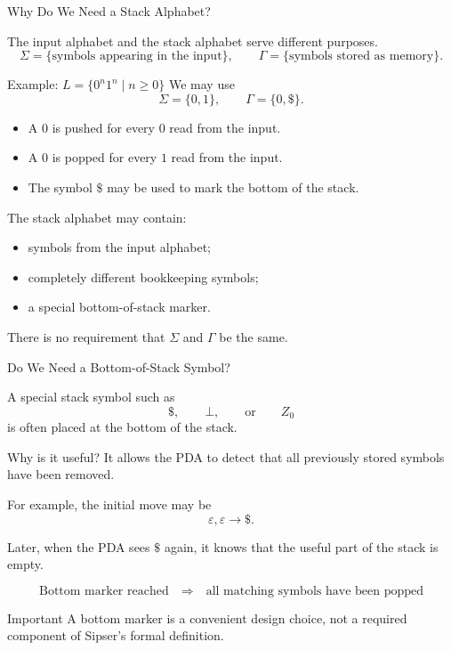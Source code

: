 \documentclass[aspectratio=169,10pt]{beamer}
\begin{document}
\begin{frame}{Why Do We Need a Stack Alphabet?}

\small
The input alphabet and the stack alphabet serve different purposes.
\[
\Sigma=\{\text{symbols appearing in the input}\},
\qquad
\Gamma=\{\text{symbols stored as memory}\}.
\]

\begin{exampleblock}{Example: \(L=\{0^n1^n\mid n\geq 0\}\)}
We may use
\[
\Sigma=\{0,1\},
\qquad
\Gamma=\{0,\$\}.
\]

\begin{itemize}
    \item A \(0\) is pushed for every \(0\) read from the input.
    \item A \(0\) is popped for every \(1\) read from the input.
    \item The symbol \(\$\) may be used to mark the bottom of the stack.
\end{itemize}
\end{exampleblock}

The stack alphabet may contain:

\begin{itemize}
    \item symbols from the input alphabet;
    \item completely different bookkeeping symbols;
    \item a special bottom-of-stack marker.
\end{itemize}

There is no requirement that \(\Sigma\) and \(\Gamma\) be the same.

\end{frame}

\begin{frame}{Do We Need a Bottom-of-Stack Symbol?}

\small
A special stack symbol such as
\[
\$,\qquad \bot,\qquad \text{or}\qquad Z_0
\]
is often placed at the bottom of the stack.

\begin{block}{Why is it useful?}
It allows the PDA to detect that all previously stored symbols have
been removed.
\end{block}

For example, the initial move may be
\[
\varepsilon,\varepsilon\to \$.
\]

Later, when the PDA sees \(\$\) again, it knows that the useful part of
the stack is empty.

\[
\boxed{\text{Bottom marker reached}}
\quad\Longrightarrow\quad
\boxed{\text{all matching symbols have been popped}}
\]

\begin{alertblock}{Important}
A bottom marker is a convenient design choice, not a required component
of Sipser's formal definition.
\end{alertblock}

\end{frame}
\end{document}
